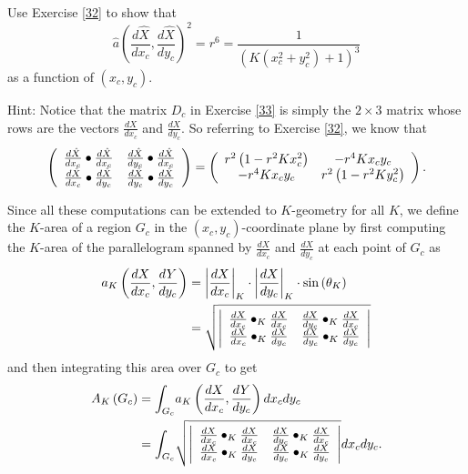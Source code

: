 \begin{exercise}
\label{79}Use Exercise \ref{32} to show that%
\[
\hat{a}\left(  \frac{d\hat{X}}{dx_{c}},\frac{d\hat{X}}{dy_{c}}\right)
^{2}=r^{6}=\frac{1}{\left(  K\left(  x_{c}^{2}+y_{c}^{2}\right)  +1\right)
^{3}}%
\]
as a function of $\left(  x_{c},y_{c}\right)  $.

Hint: Notice that the matrix $D_{c}$ in Exercise \ref{33} is simply the
$2\times3$ matrix whose rows are the vectors $\frac{dX}{dx_{c}}$ and $\frac
{dX}{dy_{c}}$. So referring to Exercise \ref{32}, we know that%
\[
\left(
\begin{array}
[c]{cc}%
\frac{d\hat{X}}{dx_{c}}\bullet\frac{d\hat{X}}{dx_{c}} & \frac{d\hat{X}}%
{dy_{c}}\bullet\frac{d\hat{X}}{dx_{c}}\\
\frac{d\hat{X}}{dx_{c}}\bullet\frac{d\hat{X}}{dy_{c}} & \frac{d\hat{X}}%
{dy_{c}}\bullet\frac{d\hat{X}}{dy_{c}}%
\end{array}
\right)  =\left(
\begin{array}
[c]{cc}%
r^{2}\left(  1-r^{2}Kx_{c}^{2}\right)  & -r^{4}Kx_{c}y_{c}\\
-r^{4}Kx_{c}y_{c} & r^{2}\left(  1-r^{2}Ky_{c}^{2}\right)
\end{array}
\right)  .
\]

\end{exercise}

Since all these computations can be extended to $K$-geometry for all $K$, we
define the $K$-area of a region $G_{c}$ in the $\left(  x_{c},y_{c}\right)
$-coordinate plane by first computing the $K$-area of the parallelogram
spanned by $\frac{dX}{dx_{c}}$ and $\frac{dX}{dy_{c}}$ at each point of
$G_{c}$ as%
\begin{align*}
a_{K}\left(  \frac{dX}{dx_{c}},\frac{dY}{dy_{c}}\right)   &  =\left\vert
\frac{dX}{dx_{c}}\right\vert _{K}\cdot\left\vert \frac{dX}{dy_{c}}\right\vert
_{K}\cdot\mathrm{sin}\left(  \theta_{K}\right) \\
&  =\sqrt{\left\vert
\begin{array}
[c]{cc}%
\frac{dX}{dx_{c}}\bullet_{K}\frac{dX}{dx_{c}} & \frac{dX}{dy_{c}}\bullet
_{K}\frac{dX}{dx_{c}}\\
\frac{dX}{dx_{c}}\bullet_{K}\frac{dX}{dy_{c}} & \frac{dX}{dy_{c}}\bullet
_{K}\frac{dX}{dy_{c}}%
\end{array}
\right\vert }%
\end{align*}
and then integrating this area over $G_{c}$ to get%
\begin{align*}
A_{K}\left(  G_{c}\right)   &  =%
{\displaystyle\int\nolimits_{G_{c}}}
a_{K}\left(  \frac{dX}{dx_{c}},\frac{dY}{dy_{c}}\right)  dx_{c}dy_{c}\\
&  =%
{\displaystyle\int\nolimits_{G_{c}}}
\sqrt{\left\vert
\begin{array}
[c]{cc}%
\frac{dX}{dx_{c}}\bullet_{K}\frac{dX}{dx_{c}} & \frac{dX}{dy_{c}}\bullet
_{K}\frac{dX}{dx_{c}}\\
\frac{dX}{dx_{c}}\bullet_{K}\frac{dX}{dy_{c}} & \frac{dX}{dy_{c}}\bullet
_{K}\frac{dX}{dy_{c}}%
\end{array}
\right\vert }dx_{c}dy_{c}.
\end{align*}
